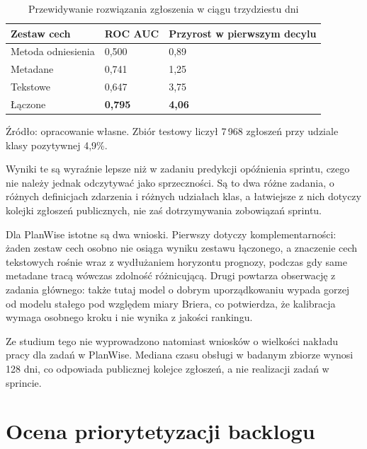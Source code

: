 \begin{table}[htbp]
    \centering
    \small
    \caption{Przewidywanie rozwiązania zgłoszenia w ciągu trzydziestu dni}
    \label{tab:wyniki-studium-pomocniczego}
    \begin{tabularx}{\textwidth}{@{}Xll@{}}
        \toprule
        \textbf{Zestaw cech} & \textbf{ROC AUC} & \textbf{Przyrost w pierwszym decylu} \\
        \midrule
        Metoda odniesienia & 0,500 & 0,89 \\
        Metadane & 0,741 & 1,25 \\
        Tekstowe & 0,647 & 3,75 \\
        Łączone & \textbf{0,795} & \textbf{4,06} \\
        \bottomrule
    \end{tabularx}

    \par\smallskip
    \begin{minipage}{\textwidth}
        \footnotesize
        Źródło: opracowanie własne. Zbiór testowy liczył 7\,968 zgłoszeń
        przy udziale klasy pozytywnej 4,9\%.
    \end{minipage}
\end{table}

Wyniki te są wyraźnie lepsze niż w zadaniu predykcji opóźnienia sprintu, czego nie należy jednak odczytywać jako sprzeczności. Są to dwa różne zadania, o różnych definicjach zdarzenia i różnych udziałach klas, a łatwiejsze z nich dotyczy kolejki zgłoszeń publicznych, nie zaś dotrzymywania zobowiązań sprintu.

Dla PlanWise istotne są dwa wnioski. Pierwszy dotyczy komplementarności: żaden zestaw cech osobno nie osiąga wyniku zestawu łączonego, a znaczenie cech tekstowych rośnie wraz z wydłużaniem horyzontu prognozy, podczas gdy same metadane tracą wówczas zdolność różnicującą. Drugi powtarza obserwację z zadania głównego: także tutaj model o dobrym uporządkowaniu wypada gorzej od modelu stałego pod względem miary Briera, co potwierdza, że kalibracja wymaga osobnego kroku i nie wynika z jakości rankingu.

Ze studium tego nie wyprowadzono natomiast wniosków o wielkości nakładu pracy dla zadań w PlanWise. Mediana czasu obsługi w badanym zbiorze wynosi 128 dni, co odpowiada publicznej kolejce zgłoszeń, a nie realizacji zadań w sprincie.

\section{Ocena priorytetyzacji backlogu}

